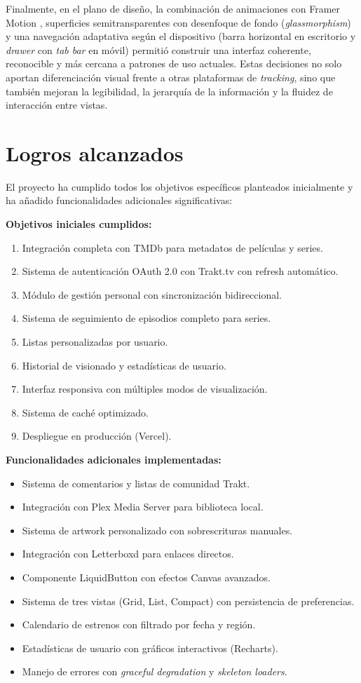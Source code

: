Finalmente, en el plano de diseño, la combinación de animaciones con Framer Motion \parencite{Framer:2024}, superficies semitransparentes con desenfoque de fondo (\textit{glassmorphism}) \parencite{Babich:2021,Nielsen:2024} y una navegación adaptativa según el dispositivo \parencite{MDN:2024d} (barra horizontal en escritorio y \textit{drawer} con \textit{tab bar} en móvil) permitió construir una interfaz coherente, reconocible y más cercana a patrones de uso actuales. Estas decisiones no solo aportan diferenciación visual frente a otras plataformas de \textit{tracking}, sino que también mejoran la legibilidad, la jerarquía de la información y la fluidez de interacción entre vistas.

\section{Logros alcanzados}

El proyecto ha cumplido todos los objetivos específicos planteados inicialmente y ha añadido funcionalidades adicionales significativas:

\textbf{Objetivos iniciales cumplidos:}
\begin{enumerate}
\item Integración completa con TMDb para metadatos de películas y series.
\item Sistema de autenticación OAuth 2.0 con Trakt.tv con refresh automático.
\item Módulo de gestión personal con sincronización bidireccional.
\item Sistema de seguimiento de episodios completo para series.
\item Listas personalizadas por usuario.
\item Historial de visionado y estadísticas de usuario.
\item Interfaz responsiva con múltiples modos de visualización.
\item Sistema de caché optimizado.
\item Despliegue en producción (Vercel).
\end{enumerate}

\textbf{Funcionalidades adicionales implementadas:}
\begin{itemize}
\item Sistema de comentarios y listas de comunidad Trakt.
\item Integración con Plex Media Server para biblioteca local.
\item Sistema de artwork personalizado con sobrescrituras manuales.
\item Integración con Letterboxd para enlaces directos.
\item Componente LiquidButton con efectos Canvas avanzados.
\item Sistema de tres vistas (Grid, List, Compact) con persistencia de preferencias.
\item Calendario de estrenos con filtrado por fecha y región.
\item Estadísticas de usuario con gráficos interactivos (Recharts).
\item Manejo de errores con \textit{graceful degradation} y \textit{skeleton loaders}.
\end{itemize}

